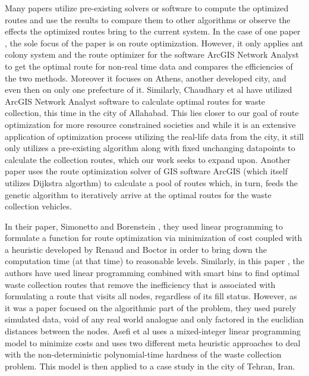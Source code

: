 \documentclass[12pt]{article}
\begin{document}
Many papers utilize pre-existing solvers or software to compute the optimized routes and use the results to compare them to other algorithms or observe the effects the optimized routes bring to the current system. In the case of one paper \cite{karadimas2008routing}, the sole focus of the paper is on route optimization. However, it only applies ant colony system and the route optimizer for the software ArcGIS Network Analyst to get the optimal route for non-real time data and compares the efficiencies of the two methods. Moreover it focuses on Athens, another developed city, and even then on only one prefecture of it. Similarly, Chaudhary et al \cite{chaudhary2019gis} have utilized ArcGIS Network Analyst software to calculate optimal routes for waste collection, this time in the city of Allahabad. This lies closer to our goal of route optimization for more resource constrained societies and while it is an extensive application of optimization process utilizing the real-life data from the city, it still only utilizes a pre-existing algorithm along with fixed unchanging datapoints to calculate the collection routes, which our work seeks to expand upon. Another paper \cite{amal2018sga} uses the route optimization solver of GIS software ArcGIS (which itself utilizes Dijkstra algorthm) to calculate a pool of routes which, in turn, feeds the genetic algorithm to iteratively arrive at the optimal routes for the waste collection vehicles.

In their paper, Simonetto and Borenstein \cite{de2007decision}, they used linear programming to formulate a function for route optimization via minimization of cost coupled with a heuristic developed by Renaud and Boctor \cite{renaud2002sweep} in order to bring down the computation time (at that time) to reasonable levels. Similarly, in this paper \cite{hannan2020waste}, the authors have used linear programming combined with smart bins to find optimal waste collection routes that remove the inefficiency that is associated with formulating a route that visits all nodes, regardless of its fill status. However, as it was a paper focused on the algorithmic part of the problem, they used purely simulated data, void of any real world analogue and only factored in the euclidian distances between the nodes. Asefi et al \cite{asefi2019mathematical} uses a mixed-integer linear programming model to minimize costs and uses two different meta heuristic approaches to deal with the non-deterministic polynomial-time hardness of the waste collection problem. This model is then applied to a case study in the city of Tehran, Iran. 
\end{document}
